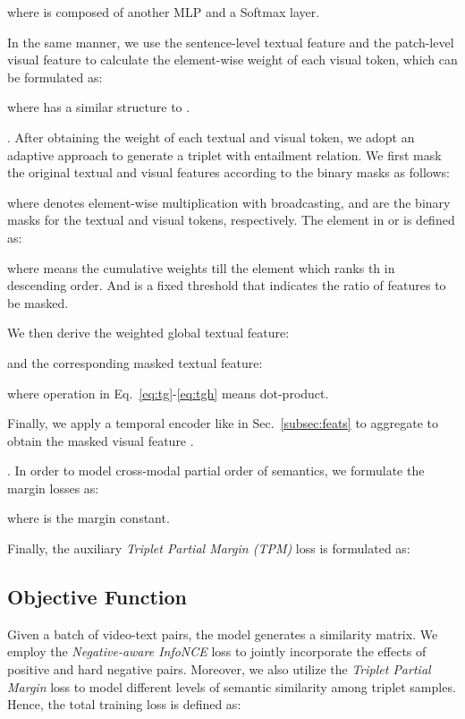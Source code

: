 \documentclass[sigconf]{acmart}
\begin{document}
where  is composed of another MLP and a Softmax layer.


In the same manner, we use the sentence-level textual feature  and the patch-level visual feature  to calculate the element-wise weight of each visual token, which can be formulated as:

where  has a similar structure to .


. After obtaining the weight of each textual and visual token, we adopt an adaptive approach to generate a triplet with entailment relation. We first mask the original textual and visual features according to the binary masks as follows:


where  denotes element-wise multiplication with broadcasting,  and  are the binary masks for the textual and visual tokens, respectively. The element  in  or  is defined as:

where  means the cumulative weights till the element  which ranks th in descending order. And  is a fixed threshold that indicates the ratio of features to be masked.

We then derive the weighted global textual feature:

and the corresponding masked textual feature:

where operation  in Eq.~\ref{eq:tg}-\ref{eq:tgh} means dot-product. 

Finally, we apply a temporal encoder like in Sec.~\ref{subsec:feats} to aggregate  to obtain the masked visual feature .



. In order to model cross-modal partial order of semantics, we formulate the margin losses as:

where  is the margin constant. 

Finally, the auxiliary \textit{Triplet Partial Margin (TPM)} loss is formulated as:




\subsection{Objective Function}\label{subsec:obj}
Given a batch of  video-text pairs, the model generates a  similarity matrix. We employ the \textit{Negative-aware InfoNCE} loss  to jointly incorporate the effects of positive and hard negative pairs. Moreover, we also utilize the \textit{Triplet Partial Margin} loss  to model different levels of semantic similarity among triplet samples. Hence, the total training loss  is defined as:
\end{document}
